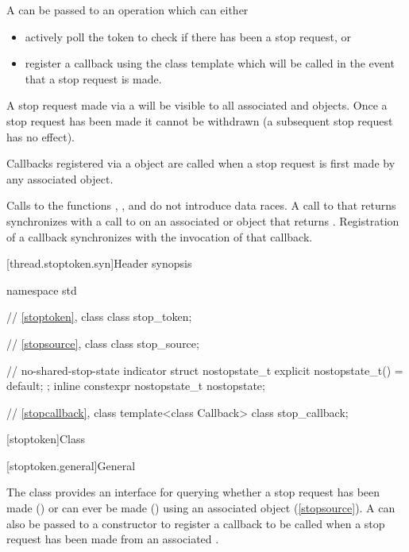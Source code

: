 \pnum
A  can be passed to an operation which can either
\begin{itemize}
 \item actively poll the token to check if there has been a stop request, or
 \item register a callback using the  class template which
        will be called in the event that a stop request is made.
\end{itemize}
A stop request made via a  will be visible to all
associated  and  objects.
Once a stop request has been made it cannot be withdrawn
(a subsequent stop request has no effect).

\pnum
Callbacks registered via a  object are called when
a stop request is first made by any associated  object.

\pnum
Calls to the functions , ,
and 
do not introduce data races.
A call to  that returns 
synchronizes with a call to 
on an associated  or  object
that returns .
Registration of a callback synchronizes with the invocation of that callback.


[thread.stoptoken.syn]{Header  synopsis}

%
\begin{codeblock}
namespace std {
  // \ref{stoptoken}, class 
  class stop_token;

  // \ref{stopsource}, class 
  class stop_source;

  // no-shared-stop-state indicator
  struct nostopstate_t {
    explicit nostopstate_t() = default;
  };
  inline constexpr nostopstate_t nostopstate{};

  // \ref{stopcallback}, class 
  template<class Callback>
  class stop_callback;
}
\end{codeblock}


[stoptoken]{Class }%
%

[stoptoken.general]{General}

\pnum
{}%
The class  provides an interface for querying whether
a stop request has been made ()
or can ever be made ()
using an associated  object (\ref{stopsource}).
A  can also be passed to a
 constructor
to register a callback to be called when a stop request has been made
from an associated .

